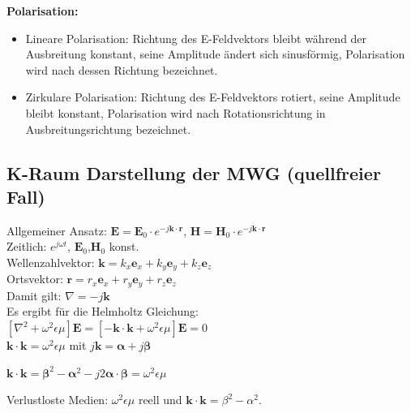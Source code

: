 \documentclass[english]{latex4ei/latex4ei_sheet}
\begin{document}
\begin{sectionbox}
    \textbf{Polarisation:}
    \begin{itemize}
        \item Lineare Polarisation: Richtung des E-Feldvektors bleibt während der Ausbreitung konstant, seine Amplitude ändert sich sinusförmig, Polarisation wird nach dessen Richtung bezeichnet.
        \item Zirkulare Polarisation: Richtung des E-Feldvektors rotiert, seine Amplitude bleibt konstant, Polarisation wird nach Rotationsrichtung in Ausbreitungsrichtung bezeichnet.
    \end{itemize}

\end{sectionbox}
\begin{sectionbox}
    \subsection{K-Raum Darstellung der MWG (quellfreier Fall)}
    Allgemeiner Ansatz: $\mathbf{E} = \mathbf{E}_0 \cdot e^{-j \mathbf{k}\cdot\mathbf{r}}$, $\mathbf{H} = \mathbf{H}_0 \cdot e^{-j \mathbf{k}\cdot\mathbf{r}}$\\
    Zeitlich: $e^{j\omega t}$, \quad $\mathbf{E}_0$,$\mathbf{H}_0$ konst.\\
    Wellenzahlvektor: $\mathbf{k} = k_x\mathbf{e}_x + k_y\mathbf{e}_y + k_z\mathbf{e}_z$\\
    Ortsvektor: $\mathbf{r} = r_x\mathbf{e}_x + r_y\mathbf{e}_y + r_z\mathbf{e}_z$\\
    Damit gilt: $\nabla = -j\mathbf{k} $\\

    Es ergibt für die Helmholtz Gleichung:\\
    $[\nabla^2 + \omega^2\epsilon\mu]\mathbf{E} = [-\mathbf{k}\cdot\mathbf{k} + \omega^2\epsilon\mu]\mathbf{E} = 0$\\
    $\mathbf{k}\cdot\mathbf{k} = \omega^2\epsilon\mu$ mit $j\mathbf{k} = \mathbf{\alpha} + j\mathbf{\beta}$\\

    \begin{emphbox}
        $\mathbf{k}\cdot\mathbf{k} = \mathbf{\beta}^2 - \mathbf{\alpha}^2 -j2\mathbf{\alpha}\cdot\mathbf{\beta} = \omega^2\epsilon\mu$
    \end{emphbox}
    Verlustloste Medien: $\omega^2\epsilon\mu$ reell und $\mathbf{k}\cdot\mathbf{k} = \beta^2 - \alpha^2$.
\end{sectionbox}
\end{document}
